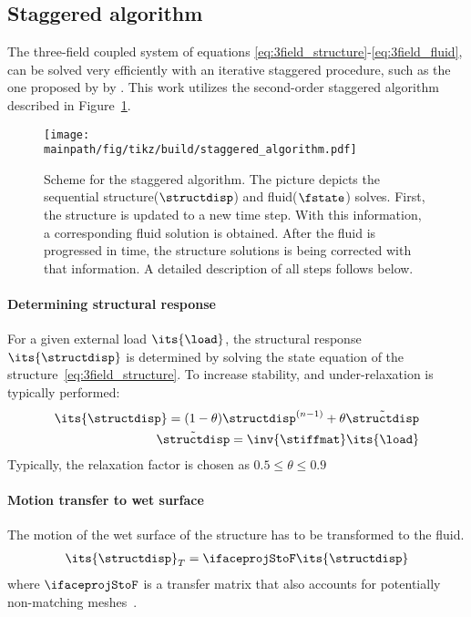\documentclass[../main.tex]{subfiles}
\begin{document}
\subsection{Staggered algorithm}\label{sec:staggered_algorithm}
The three-field coupled system of equations \eqref{eq:3field_structure}-\eqref{eq:3field_fluid}, can be solved very efficiently with an iterative staggered procedure, such as the one proposed by by \cite{Farhat1995}. This work utilizes the second-order staggered algorithm described in Figure~\ref{fig:staggered_algorithm}.


\begin{figure}[h!]
	\begin{center}
        \texttt{[image: \\mainpath/fig/tikz/build/staggered\_algorithm.pdf]}
        \caption[Staggered algorithm scheme]{Scheme for the staggered algorithm. The picture depicts the sequential structure($\structdisp$) and fluid($\fstate$) solves. First, the structure is updated to a new time step. With this information, a corresponding fluid solution is obtained. After the fluid is progressed in time, the structure solutions is being corrected with that information. A detailed description of all steps follows below.}
		\label{fig:staggered_algorithm}
    \end{center}
\end{figure}


\paragraph{\raisebox{.5pt}{\textcircled{\raisebox{-.9pt} {1}}} Determining structural response}
For a given external load $\its{\load}$, the structural response $\its{\structdisp}$ is determined by solving the state equation of the structure~\eqref{eq:3field_structure}. To increase stability, and under-relaxation is typically performed:
\begin{align}
\its{\structdisp}=(1-\theta)\structdisp^{(n-1)}+\theta \tilde{\structdisp} \\
\tilde{\structdisp} = \inv{\stiffmat} \its{\load}
\end{align}
Typically, the relaxation factor is chosen as $0.5\leq\theta\leq 0.9$

\paragraph{\raisebox{.5pt}{\textcircled{\raisebox{-.9pt} {2}}} Motion transfer to wet surface}
The motion of the wet surface of the structure has to be transformed to the fluid.
\begin{align}
\its{\structdisp}_T = \ifaceprojStoF \its{\structdisp}
\end{align}
where $\ifaceprojStoF$ is a transfer matrix that also accounts for potentially non-matching meshes~\cite{Maute2001}.
\end{document}
